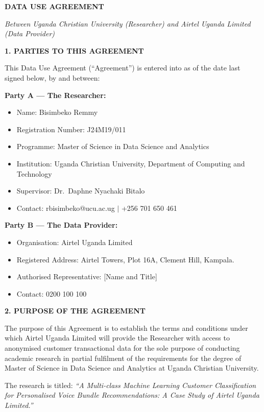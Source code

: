 \textbf{DATA USE AGREEMENT}

\textit{Between Uganda Christian University (Researcher) and Airtel Uganda Limited (Data Provider)}

\vspace{0.5cm}
\textbf{1. PARTIES TO THIS AGREEMENT}

This Data Use Agreement (``Agreement'') is entered into as of the date last signed below, by and between:

\textbf{Party A --- The Researcher:}
\begin{itemize}[leftmargin=2cm]
    \item Name: Bisimbeko Remmy
    \item Registration Number: J24M19/011
    \item Programme: Master of Science in Data Science and Analytics
    \item Institution: Uganda Christian University, Department of Computing and Technology
    \item Supervisor: Dr.\ Daphne Nyachaki Bitalo
    \item Contact: rbisimbeko@ucu.ac.ug $|$ +256 701 650 461
\end{itemize}

\textbf{Party B --- The Data Provider:}
\begin{itemize}[leftmargin=2cm]
    \item Organisation: Airtel Uganda Limited
    \item Registered Address: Airtel Towers, Plot 16A, Clement Hill, Kampala.
    \item Authorised Representative: [Name and Title]
    \item Contact: 0200 100 100
\end{itemize}

\vspace{0.3cm}
\textbf{2. PURPOSE OF THE AGREEMENT}

The purpose of this Agreement is to establish the terms and conditions under which Airtel Uganda Limited will provide the Researcher with access to anonymised customer transactional data for the sole purpose of conducting academic research in partial fulfilment of the requirements for the degree of Master of Science in Data Science and Analytics at Uganda Christian University.

The research is titled: \textit{``A Multi-class Machine Learning Customer Classification for Personalised Voice Bundle Recommendations: A Case Study of Airtel Uganda Limited.''}

